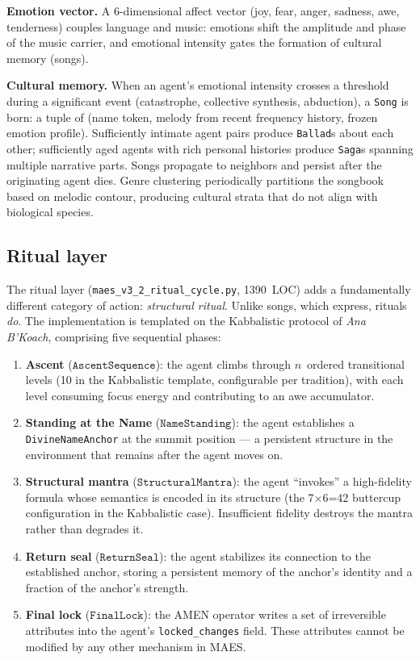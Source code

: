 \documentclass[11pt,a4paper]{article}
\begin{document}
\textbf{Emotion vector.} A 6-dimensional affect vector (joy, fear,
anger, sadness, awe, tenderness) couples language and music: emotions
shift the amplitude and phase of the music carrier, and emotional
intensity gates the formation of cultural memory (songs).

\textbf{Cultural memory.} When an agent's emotional intensity crosses a
threshold during a significant event (catastrophe, collective synthesis,
abduction), a \texttt{Song} is born: a tuple of (name token, melody from
recent frequency history, frozen emotion profile). Sufficiently intimate
agent pairs produce \texttt{Ballad}s about each other; sufficiently aged
agents with rich personal histories produce \texttt{Saga}s spanning
multiple narrative parts. Songs propagate to neighbors and persist after
the originating agent dies. Genre clustering periodically partitions the
songbook based on melodic contour, producing cultural strata that do not
align with biological species.

\subsection{Ritual layer}

The ritual layer (\texttt{maes\_v3\_2\_ritual\_cycle.py}, 1390~LOC) adds
a fundamentally different category of action: \emph{structural ritual}.
Unlike songs, which express, rituals \emph{do}. The implementation is
templated on the Kabbalistic protocol of \emph{Ana B'Koach}, comprising
five sequential phases:

\begin{enumerate}
\item \textbf{Ascent} ($\texttt{AscentSequence}$): the agent climbs
      through $n$~ordered transitional levels (10 in the Kabbalistic
      template, configurable per tradition), with each level consuming
      focus energy and contributing to an awe accumulator.
\item \textbf{Standing at the Name} ($\texttt{NameStanding}$): the agent
      establishes a \texttt{DivineNameAnchor} at the summit position ---
      a persistent structure in the environment that remains after the
      agent moves on.
\item \textbf{Structural mantra} ($\texttt{StructuralMantra}$): the agent
      ``invokes'' a high-fidelity formula whose semantics is encoded in
      its structure (the 7$\times$6=42 buttercup configuration in the
      Kabbalistic case). Insufficient fidelity destroys the mantra
      rather than degrades it.
\item \textbf{Return seal} ($\texttt{ReturnSeal}$): the agent stabilizes
      its connection to the established anchor, storing a persistent
      memory of the anchor's identity and a fraction of the anchor's
      strength.
\item \textbf{Final lock} ($\texttt{FinalLock}$): the AMEN operator
      writes a set of irreversible attributes into the agent's
      \texttt{locked\_changes} field. These attributes cannot be modified
      by any other mechanism in MAES.
\end{enumerate}
\end{document}
